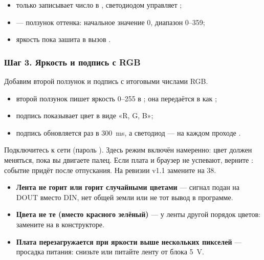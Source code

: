 
\begin{itemize}[leftmargin=*]
  \item {} только записывает число в , светодиодом управляет ;
  \item {} --- ползунок оттенка: начальное значение 0, диапазон 0--359;
  \item яркость пока зашита в вызов .
\end{itemize}

\subsubsection{Шаг 3. Яркость и подпись с RGB}

Добавим второй ползунок и подпись с итоговыми числами RGB.


\begin{itemize}[leftmargin=*]
  \item второй ползунок пишет яркость 0--255 в ; она передаётся в  как ;
  \item подпись  показывает цвет в виде «R, G, B»;
  \item подпись обновляется раз в \SI{300}{ms}, а светодиод --- на каждом проходе .
\end{itemize}

Подключитесь к сети  (пароль ). Здесь режим
 включён намеренно: цвет должен меняться, пока вы двигаете палец. Если
плата и браузер не успевают, верните : событие придёт после отпускания. На ревизии
v1.1 замените  на 38.

\begin{trouble}
\begin{itemize}[leftmargin=*]
  \item \textbf{Лента не горит или горит случайными цветами} --- сигнал подан на DOUT вместо DIN, нет общей земли или не тот вывод в программе.
  \item \textbf{Цвета не те (вместо красного зелёный)} --- у ленты другой порядок цветов: замените  на  в конструкторе.
  \item \textbf{Плата перезагружается при яркости выше нескольких пикселей} --- просадка питания: снизьте  или питайте ленту от блока \SI{5}{V}.
\end{itemize}
\end{trouble}

